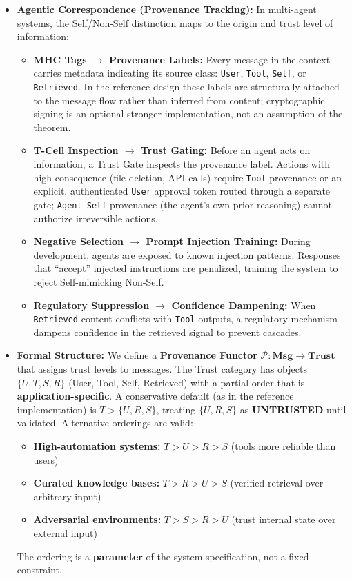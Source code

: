 \begin{itemize}[leftmargin=*]
\item \textbf{Agentic Correspondence (Provenance Tracking):} In multi-agent systems, the Self/Non-Self distinction maps to the origin and trust level of information:
\begin{itemize}
\item \textbf{MHC Tags $\to$ Provenance Labels:} Every message in the context carries metadata indicating its source class: \texttt{User}, \texttt{Tool}, \texttt{Self}, or \texttt{Retrieved}. In the reference design these labels are structurally attached to the message flow rather than inferred from content; cryptographic signing is an optional stronger implementation, not an assumption of the theorem.
\item \textbf{T-Cell Inspection $\to$ Trust Gating:} Before an agent acts on information, a Trust Gate inspects the provenance label. Actions with high consequence (file deletion, API calls) require \texttt{Tool} provenance or an explicit, authenticated \texttt{User} approval token routed through a separate gate; \texttt{Agent\_Self} provenance (the agent's own prior reasoning) cannot authorize irreversible actions.
\item \textbf{Negative Selection $\to$ Prompt Injection Training:} During development, agents are exposed to known injection patterns. Responses that ``accept'' injected instructions are penalized, training the system to reject Self-mimicking Non-Self.
\item \textbf{Regulatory Suppression $\to$ Confidence Dampening:} When \texttt{Retrieved} content conflicts with \texttt{Tool} outputs, a regulatory mechanism dampens confidence in the retrieved signal to prevent cascades.
\end{itemize}

\item \textbf{Formal Structure:} We define a \textbf{Provenance Functor} $\mathcal{P}: \mathbf{Msg} \to \mathbf{Trust}$ that assigns trust levels to messages. The Trust category has objects $\{U, T, S, R\}$ (User, Tool, Self, Retrieved) with a partial order that is \textbf{application-specific}. A conservative default (as in the reference implementation) is $T > \{U,R,S\}$, treating $\{U,R,S\}$ as \textbf{UNTRUSTED} until validated. Alternative orderings are valid:
\begin{itemize}
\item \textbf{High-automation systems:} $T > U > R > S$ (tools more reliable than users)
\item \textbf{Curated knowledge bases:} $T > R > U > S$ (verified retrieval over arbitrary input)
\item \textbf{Adversarial environments:} $T > S > R > U$ (trust internal state over external input)
\end{itemize}
The ordering is a \textbf{parameter} of the system specification, not a fixed constraint.


\end{itemize}
